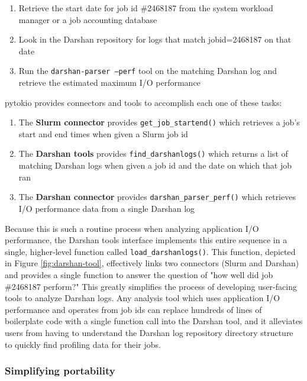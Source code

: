 \begin{enumerate}[leftmargin=*]
\item Retrieve the start date for job id \#2468187 from the system workload manager or a job accounting database
\item Look in the Darshan repository for logs that match jobid=2468187 on that date
\item Run the \texttt{darshan-parser --perf} tool on the matching Darshan log and retrieve the estimated maximum I/O performance
\end{enumerate}

pytokio provides connectors and tools to accomplish each one of these tasks:

\begin{enumerate}[leftmargin=*]
\item The \textbf{Slurm connector} provides \texttt{get\_job\_startend()} which retrieves a job's start and end times when given a Slurm job id
\item The \textbf{Darshan tools} provides \texttt{find\_darshanlogs()} which returns a list of matching Darshan logs when given a job id and the date on which that job ran
\item The \textbf{Darshan connector} provides \texttt{darshan\_parser\_perf()} which retrieves I/O performance data from a single Darshan log
\end{enumerate}

Because this is such a routine process when analyzing application I/O performance, the Darshan tools interface implements this entire sequence in a single, higher-level function called \texttt{load\_darshanlogs()}.
This function, depicted in Figure \ref{fig:darshan-tool}, effectively links two connectors (Slurm and Darshan) and provides a single function to answer the question of "how well did job \#2468187 perform?"
This greatly simplifies the process of developing user-facing tools to analyze Darshan logs.
Any analysis tool which uses application I/O performance and operates from job ids can replace hundreds of lines of boilerplate code with a single function call into the Darshan tool, and it alleviates users from having to understand the Darshan log repository directory structure to quickly find profiling data for their jobs.

\subsubsection{Simplifying portability}

